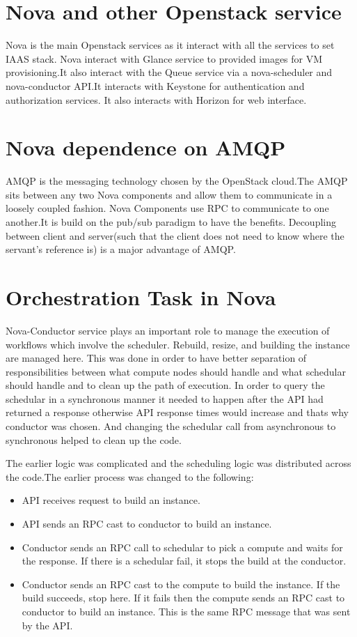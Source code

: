 \documentclass[9pt,twocolumn,twoside]{../../styles/osajnl}
\begin{document}
\section{Nova and other Openstack service}

Nova is the main Openstack services as it interact with all the services to set IAAS stack.
Nova interact with Glance service to provided images for VM provisioning.It also interact with the Queue service via a nova-scheduler and nova-conductor API.It interacts with Keystone for authentication and authorization services. It also interacts with Horizon for web interface.

\section{Nova dependence on AMQP}
AMQP is the messaging technology chosen by the OpenStack cloud.The AMQP sits between any two Nova components and allow them to communicate in a loosely coupled fashion. Nova Components use RPC to communicate to one another.It is build on the pub/sub paradigm to have the benefits. Decoupling between client and server(such that the client does not need to know where the servant's reference is) is a major advantage of AMQP\cite{www-nova-amqp}.

\section{Orchestration Task in Nova}
Nova-Conductor service plays an important role to manage the execution of workflows which involve the scheduler. Rebuild, resize, and building the instance are managed here. This was done in order to have better separation of responsibilities between what compute nodes should handle and what schedular should handle and to clean up the path of execution. In order to query the schedular in a synchronous manner it needed to happen after the API had returned a response otherwise API response times would increase and thats why conductor was chosen. And changing the schedular call from asynchronous to synchronous helped to clean up the code\cite{www-nova-orchestrator}.

The earlier logic was complicated and the scheduling logic was distributed across the code.The earlier process was changed to the following:

\begin{itemize}
\item API receives request to build an instance.
\item API sends an RPC cast to conductor to build an instance.
\item Conductor sends an RPC call to schedular to pick a compute and waits for the response. If there is a schedular fail, it stops the build at the conductor.
\item Conductor sends an RPC cast to the compute to build the instance. If the build succeeds, stop here. If it fails then the compute sends an RPC cast to conductor to build an instance. This is the same RPC message that was sent by the API.

\end{itemize}
\end{document}
